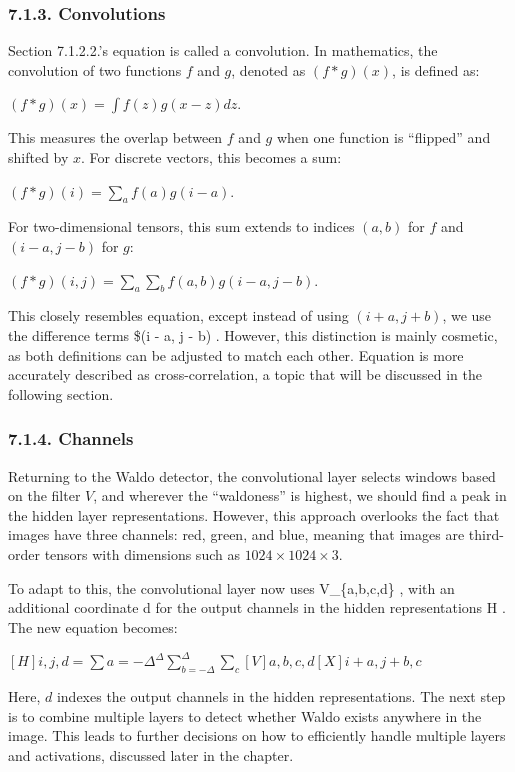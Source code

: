 \documentclass[11pt]{article}
\begin{document}
    \subsubsection*{7.1.3. Convolutions}\label{convolutions}

    Section 7.1.2.2.'s equation is called a convolution. In mathematics, the
convolution of two functions \(f\) and \(g\), denoted as \((f * g)(x)\),
is defined as:

\((f * g)(x) = \int f(z) g(x - z) dz\).

This measures the overlap between \(f\) and \(g\) when one function is
``flipped'' and shifted by \(x\). For discrete vectors, this becomes a
sum:

\((f * g)(i) = \sum_a f(a) g(i - a)\).

For two-dimensional tensors, this sum extends to indices \((a, b)\) for
\(f\) and \((i - a, j - b)\) for \(g\):

\((f * g)(i, j) = \sum_a \sum_b f(a, b) g(i - a, j - b)\).

This closely resembles equation, except instead of using
\((i + a, j + b)\), we use the difference terms \$(i - a, j - b) .
However, this distinction is mainly cosmetic, as both definitions can be
adjusted to match each other. Equation is more accurately described as
cross-correlation, a topic that will be discussed in the following
section.

    \subsubsection*{7.1.4. Channels}\label{channels}

    Returning to the Waldo detector, the convolutional layer selects windows
based on the filter \(V\), and wherever the ``waldoness'' is highest, we
should find a peak in the hidden layer representations. However, this
approach overlooks the fact that images have three channels: red, green,
and blue, meaning that images are third-order tensors with dimensions
such as \(1024 \times 1024 \times 3\).

To adapt to this, the convolutional layer now uses V\_\{a,b,c,d\} , with
an additional coordinate d for the output channels in the hidden
representations H . The new equation becomes:

\([H]{i,j,d} = \sum{a=-\Delta}^{\Delta} \sum_{b=-\Delta}^{\Delta} \sum_{c} [V]{a,b,c,d} [X]{i+a,j+b,c}\)

Here, \(d\) indexes the output channels in the hidden representations.
The next step is to combine multiple layers to detect whether Waldo
exists anywhere in the image. This leads to further decisions on how to
efficiently handle multiple layers and activations, discussed later in
the chapter.
\end{document}
